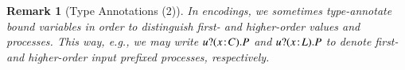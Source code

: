 \documentclass[preprint,11pt]{elsarticle}
\newtheorem{remark}{Remark}[section]
\begin{document}
{\begin{remark}[Type Annotations (2)]\label{r:types}
In  encodings, we sometimes type-annotate
bound variables in order to distinguish first- and higher-order values and processes.
This way, e.g., 
we may write $u ? (x \! : \! C) . P$
and 
$u ? (x \! : \! L) . P$ to denote first- and higher-order input prefixed processes, respectively.
\end{remark}

}
\end{document}
